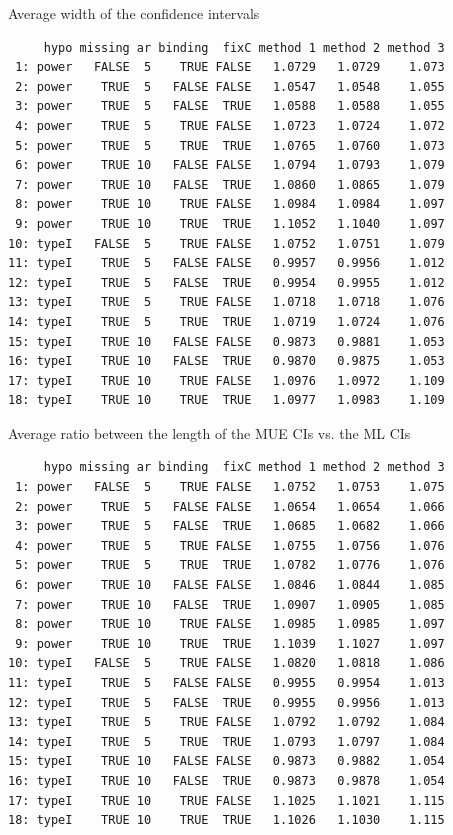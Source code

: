\documentclass[12pt]{article}
\begin{document}
Average width of the confidence intervals
\begin{verbatim}
     hypo missing ar binding  fixC method 1 method 2 method 3
 1: power   FALSE  5    TRUE FALSE   1.0729   1.0729    1.073
 2: power    TRUE  5   FALSE FALSE   1.0547   1.0548    1.055
 3: power    TRUE  5   FALSE  TRUE   1.0588   1.0588    1.055
 4: power    TRUE  5    TRUE FALSE   1.0723   1.0724    1.072
 5: power    TRUE  5    TRUE  TRUE   1.0765   1.0760    1.073
 6: power    TRUE 10   FALSE FALSE   1.0794   1.0793    1.079
 7: power    TRUE 10   FALSE  TRUE   1.0860   1.0865    1.079
 8: power    TRUE 10    TRUE FALSE   1.0984   1.0984    1.097
 9: power    TRUE 10    TRUE  TRUE   1.1052   1.1040    1.097
10: typeI   FALSE  5    TRUE FALSE   1.0752   1.0751    1.079
11: typeI    TRUE  5   FALSE FALSE   0.9957   0.9956    1.012
12: typeI    TRUE  5   FALSE  TRUE   0.9954   0.9955    1.012
13: typeI    TRUE  5    TRUE FALSE   1.0718   1.0718    1.076
14: typeI    TRUE  5    TRUE  TRUE   1.0719   1.0724    1.076
15: typeI    TRUE 10   FALSE FALSE   0.9873   0.9881    1.053
16: typeI    TRUE 10   FALSE  TRUE   0.9870   0.9875    1.053
17: typeI    TRUE 10    TRUE FALSE   1.0976   1.0972    1.109
18: typeI    TRUE 10    TRUE  TRUE   1.0977   1.0983    1.109
\end{verbatim}

Average ratio between the length of the MUE CIs vs. the ML CIs
\begin{verbatim}
     hypo missing ar binding  fixC method 1 method 2 method 3
 1: power   FALSE  5    TRUE FALSE   1.0752   1.0753    1.075
 2: power    TRUE  5   FALSE FALSE   1.0654   1.0654    1.066
 3: power    TRUE  5   FALSE  TRUE   1.0685   1.0682    1.066
 4: power    TRUE  5    TRUE FALSE   1.0755   1.0756    1.076
 5: power    TRUE  5    TRUE  TRUE   1.0782   1.0776    1.076
 6: power    TRUE 10   FALSE FALSE   1.0846   1.0844    1.085
 7: power    TRUE 10   FALSE  TRUE   1.0907   1.0905    1.085
 8: power    TRUE 10    TRUE FALSE   1.0985   1.0985    1.097
 9: power    TRUE 10    TRUE  TRUE   1.1039   1.1027    1.097
10: typeI   FALSE  5    TRUE FALSE   1.0820   1.0818    1.086
11: typeI    TRUE  5   FALSE FALSE   0.9955   0.9954    1.013
12: typeI    TRUE  5   FALSE  TRUE   0.9955   0.9956    1.013
13: typeI    TRUE  5    TRUE FALSE   1.0792   1.0792    1.084
14: typeI    TRUE  5    TRUE  TRUE   1.0793   1.0797    1.084
15: typeI    TRUE 10   FALSE FALSE   0.9873   0.9882    1.054
16: typeI    TRUE 10   FALSE  TRUE   0.9873   0.9878    1.054
17: typeI    TRUE 10    TRUE FALSE   1.1025   1.1021    1.115
18: typeI    TRUE 10    TRUE  TRUE   1.1026   1.1030    1.115
\end{verbatim}
\end{document}
